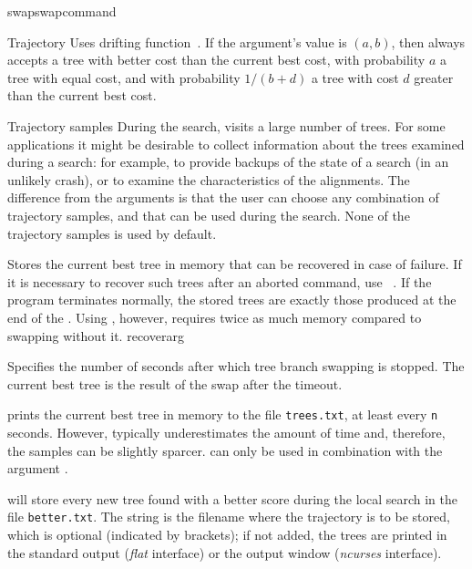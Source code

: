 \begin{command}{swap}{swapcommand}
\begin{arguments}
\begin{argumentgroup}{Trajectory}
{Uses \poy drifting function~\cite{goloboff1999}. If the argument's value is
$(a, b)$, then \poy always accepts a tree with better cost than
the current best cost, with probability $a$ a tree with equal cost,
and with probability $1 / (b + d)$ a tree with cost $d$ greater
than the current best cost.}
{}

\end{argumentgroup}

\begin{argumentgroup}{Trajectory samples}
{During the search, \poy visits a large number of trees. For some
applications it might be desirable to collect information about the
trees examined during a search: for example, to provide backups of
the state of a search (in an unlikely crash), or to examine the
characteristics of the alignments. The difference from the
 arguments is that the user can choose any
combination of trajectory samples, and that can be used during the
search. None of the trajectory samples is used by default.}

{Stores the current best tree in memory that can be recovered in
case of failure. If it is necessary to recover such trees after
an aborted command, use ~. If the program
terminates normally, the stored trees are exactly those produced
at the end of the . Using
, however, requires twice as much memory
compared to swapping without it.}
{recoverarg}

{Specifies the number of seconds after which tree branch
swapping is stopped. The current best tree is the result of the
swap after the timeout.} 
{}

{ prints the current
best tree in memory to the file \texttt{trees.txt}, at least every 
\texttt{n} seconds. However, \poy typically underestimates the amount of
time and, therefore, the samples can be slightly sparcer.  
can only be used in combination with the argument .}
{}

{ will store every new tree
found with a better score during the local search in the file
\texttt{better.txt}. The string is the filename where the
trajectory is to be stored, which is optional (indicated by
brackets); if not added, the trees are printed in the standard
output (\emph{flat} interface) or the output window (\emph{ncurses} 
interface).}
{} 


\end{argumentgroup}
\end{arguments}
\end{command}

